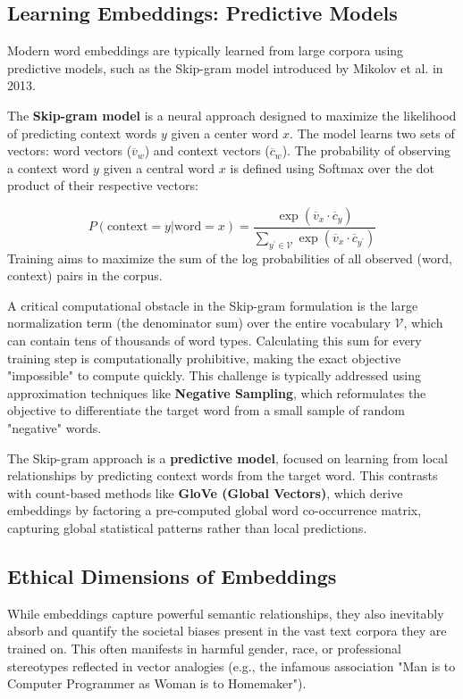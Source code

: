 \documentclass{article}
\begin{document}
\subsection{Learning Embeddings: Predictive Models}

Modern word embeddings are typically learned from large corpora using predictive models, such as the Skip-gram model introduced by Mikolov et al. in 2013.

The \textbf{Skip-gram model} is a neural approach designed to maximize the likelihood of predicting context words $y$ given a center word $x$. The model learns two sets of vectors: word vectors ($\overline{v}_w$) and context vectors ($\overline{c}_w$). The probability of observing a context word $y$ given a central word $x$ is defined using Softmax over the dot product of their respective vectors:

$$P(\text{context}=y|\text{word}=x)=\frac{\exp(\overline{v}_{x}\cdot\overline{c}_{y})}{\sum_{y^{\prime}\in\mathcal{V}}\exp(\overline{v}_{x}\cdot\overline{c}_{y^{\prime}})}$$
Training aims to maximize the sum of the log probabilities of all observed (word, context) pairs in the corpus.

A critical computational obstacle in the Skip-gram formulation is the large normalization term (the denominator sum) over the entire vocabulary $\mathcal{V}$, which can contain tens of thousands of word types. Calculating this sum for every training step is computationally prohibitive, making the exact objective "impossible" to compute quickly. This challenge is typically addressed using approximation techniques like \textbf{Negative Sampling}, which reformulates the objective to differentiate the target word from a small sample of random "negative" words.

The Skip-gram approach is a \textbf{predictive model}, focused on learning from local relationships by predicting context words from the target word. This contrasts with count-based methods like \textbf{GloVe (Global Vectors)}, which derive embeddings by factoring a pre-computed global word co-occurrence matrix, capturing global statistical patterns rather than local predictions.

\subsection{Ethical Dimensions of Embeddings}

While embeddings capture powerful semantic relationships, they also inevitably absorb and quantify the societal biases present in the vast text corpora they are trained on. This often manifests in harmful gender, race, or professional stereotypes reflected in vector analogies (e.g., the infamous association "Man is to Computer Programmer as Woman is to Homemaker").
\end{document}
